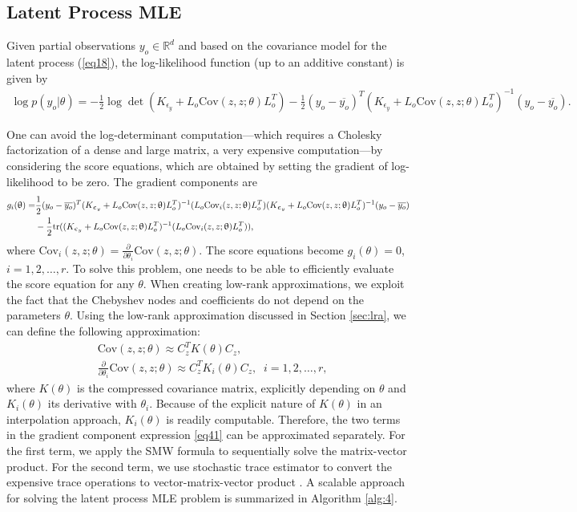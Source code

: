 \documentclass[article,ij4uq]{ij4uq}              %
\begin{document}
\subsection{Latent Process MLE}\label{sec:41}
\par Given partial observations $y_{o}\in\mathbb{R}^{d}$ and based on the covariance model for the latent process (\ref{eq18}), the log-likelihood function (up to an additive constant) is given by
\begin{align}
    \log{p(y_{o}|\theta)}=-\frac{1}{2}\log{\det{(K_{\epsilon_{y}}+L_{o}\mathrm{Cov}(z,z;\theta)L_{o}^{T})}}-\frac{1}{2}(y_{o}-\overline{y_{o}})^{T}(K_{\epsilon_{y}}+L_{o}\mathrm{Cov}(z,z;\theta)L_{o}^{T})^{-1}(y_{o}-\overline{y_{o}}).\label{eq40}
\end{align}
\par One can avoid the log-determinant computation---which requires a Cholesky factorization of a dense and large matrix, a very expensive computation---by considering the score equations, which are obtained by setting the gradient of log-likelihood to be zero. The gradient components are
\begin{align}
    g_{i}(\theta)=&\frac{1}{2}(y_{o}-\overline{y_{o}})^{T}(K_{\epsilon_{y}}+L_{o}\mathrm{Cov}(z,z;\theta)L_{o}^{T})^{-1}(L_{o}\mathrm{Cov}_{i}(z,z;\theta)L_{o}^{T})(K_{\epsilon_{y}}+L_{o}\mathrm{Cov}(z,z;\theta)L_{o}^{T})^{-1}(y_{o}-\overline{y_{o}})\notag\\
    &-\frac{1}{2}\mathrm{tr}((K_{\epsilon_{y}}+L_{o}\mathrm{Cov}(z,z;\theta)L_{o}^{T})^{-1}(L_{o}\mathrm{Cov}_{i}(z,z;\theta)L_{o}^{T})),\label{eq41}
\end{align}
where $\mathrm{Cov}_{i}(z,z;\theta)=\frac{\partial}{\partial \theta_{i}}\mathrm{Cov}(z,z;\theta)$. The score equations become $g_i(\theta)=0$, $i=1,2,\ldots,r$. To solve this problem, one needs to be able to efficiently evaluate the score equation for any $\theta$. When creating low-rank approximations, we exploit the fact that the Chebyshev nodes and coefficients do not depend on the parameters $\theta$. Using the low-rank approximation discussed in Section \ref{sec:lra}, we can define the following approximation:
\begin{align}
    &\mathrm{Cov}(z,z;\theta)\approx C_{z}^{T}K(\theta)C_{z},\label{eq:low-rank}\\
    &\frac{\partial}{\partial \theta_{i}}\mathrm{Cov}(z,z;\theta) \approx C_{z}^{T}K_{i}(\theta)C_{z},\;\; i=1,2,\ldots,r ,\label{eq:low-rank-deriv}
\end{align}
where $K(\theta)$ is the compressed covariance matrix, explicitly depending on $\theta$ and $K_i(\theta)$ its derivative with $\theta_i$. Because of the explicit nature of $K(\theta)$ in an interpolation approach, $K_i(\theta)$ is readily computable. Therefore, the two terms in the gradient component expression \eqref{eq41} can be approximated separately. For the first term, we apply the SMW formula to sequentially solve the matrix-vector product. For the second term, we use stochastic trace estimator to convert the expensive trace operations to vector-matrix-vector product \cite{stein2013stochastic}. A scalable approach for solving the latent process MLE problem is summarized in Algorithm \ref{alg:4}.
\end{document}
